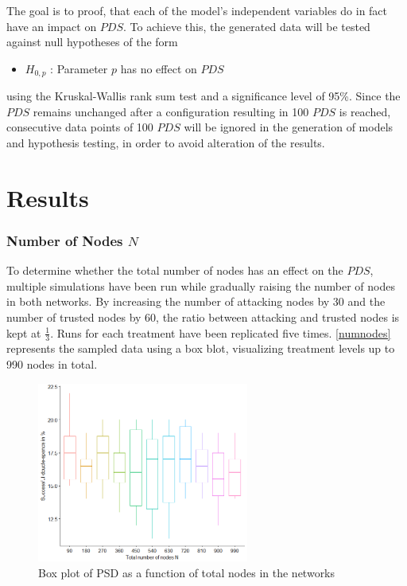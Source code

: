 \documentclass[a4paper,12pt,twoside]{report}
\begin{document}
The goal is to proof, that each of the model's independent variables do in fact have an impact on $PDS$. To achieve this, the generated data will be tested against null hypotheses of the form

\begin{itemize}
\item[] $H_{0,p}$ : Parameter $p$ has no effect on $PDS$ 
\end{itemize}
using the Kruskal-Wallis rank sum test and a significance level of 95\%. Since the $PDS$ remains unchanged after a configuration resulting in 100 $PDS$ is reached, consecutive data points of 100 $PDS$ will be ignored in the generation of models and hypothesis testing, in order to avoid alteration of the results.
\section{Results} \label{results}
\subsubsection{Number of Nodes $N$}
To determine whether the total number of nodes has an effect on the $PDS$, multiple simulations have been run while gradually raising the number of nodes in both networks. By increasing the number of attacking nodes by 30 and the number of trusted nodes by 60, the ratio between attacking and trusted nodes is kept at $\frac{1}{3}$. Runs for each treatment have been replicated five times.  \autoref{numnodes} represents the sampled data using a box blot, visualizing treatment levels up to 990 nodes in total.\begin{figure}[ht]
	\centering
  \includegraphics[width=0.62\textwidth]{Experiments/numnodes.png}
	\caption{Box plot of PSD as a function of total nodes in the networks}
	\label{numnodes}
\end{figure}
\end{document}
